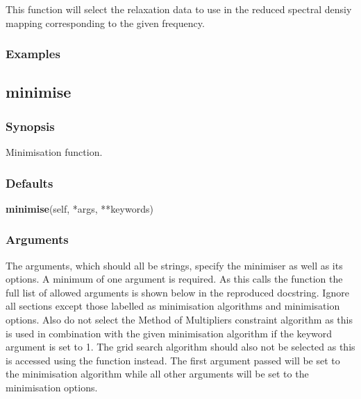 This function will select the relaxation  data to use in the reduced spectral densiy mapping 
corresponding to the given frequency.


\subsubsection{Examples}





\newpage

\subsection{minimise}


\subsubsection{Synopsis}

Minimisation function.

\subsubsection{Defaults}

\textsf{\textbf{minimise}(self, *args, **keywords)}


\subsubsection{Arguments}

The arguments, which should all be strings, specify the minimiser  as well as its options.  A
minimum of one argument is required.  As this calls the function 
 the full
list of allowed arguments is shown below in the reproduced 
 docstring.
Ignore all sections except those labelled as minimisation  algorithms and minimisation 
options.  Also do not select the Method of Multipliers  constraint  algorithm as this is used
in combination with the given minimisation  algorithm if the keyword argument 
is set to 1.  The grid search algorithm should also not be selected as this is accessed
using the 
 function instead.  The first argument passed will be set to the
minimisation  algorithm while all other arguments will be set to the minimisation  options.

